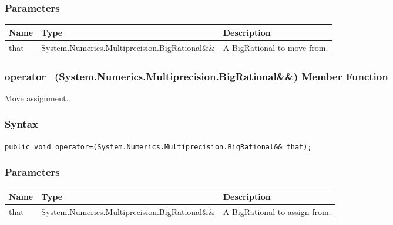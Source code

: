 \documentclass[a4paper,oneside,11.000000pt]{book}
\begin{document}
\subsubsection*{Parameters}
\begin{flushleft}
\begin{supertabular}[l]{!{\raggedright}p{1.30721cm}!{\raggedright}p{8.55945cm}!{\raggedright}p{4.93333cm}}
\textbf{Name}
& \textbf{Type}
& \textbf{Description}
\\
\hline
that
& \hyperlink{System.Numerics.Multiprecision.BigRational}{System.\-Numerics.\-Multiprecision.\-BigRational\&\-\&\-}
& A \hyperlink{System.Numerics.Multiprecision.BigRational}{BigRational} to move from.

\\
\end{supertabular}

\end{flushleft}
\clearpage

\hypertarget{System.Numerics.Multiprecision.BigRational.operator.assign.P.System.Numerics.Multiprecision.BigRational.RR.System.Numerics.Multiprecision.BigRational}{\subsubsection*{operator=(System.Numerics.Multiprecision.BigRational\&\&) Member Function}}\begin{flushleft}
Move assignment.

\end{flushleft}
\subsubsection*{Syntax}
\texttt{public void operator=(System.Numerics.Multiprecision.BigRational\&\& that);}
\subsubsection*{Parameters}
\begin{flushleft}
\begin{supertabular}[l]{!{\raggedright}p{1.30721cm}!{\raggedright}p{8.55945cm}!{\raggedright}p{4.93333cm}}
\textbf{Name}
& \textbf{Type}
& \textbf{Description}
\\
\hline
that
& \hyperlink{System.Numerics.Multiprecision.BigRational}{System.\-Numerics.\-Multiprecision.\-BigRational\&\-\&\-}
& A \hyperlink{System.Numerics.Multiprecision.BigRational}{BigRational} to assign from.

\\
\end{supertabular}

\end{flushleft}
\clearpage
\end{document}
